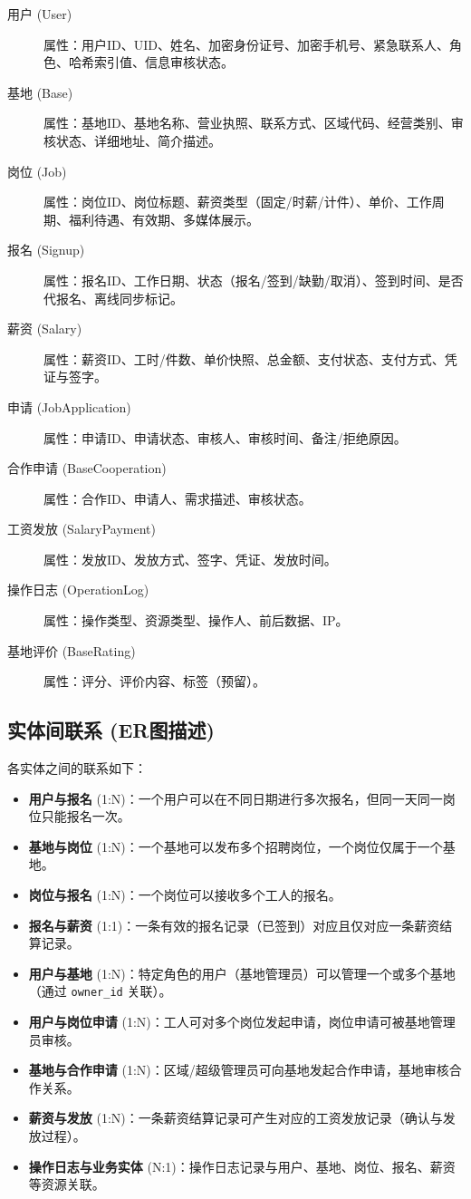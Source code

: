 \documentclass[UTF8,a4paper,12pt]{article}
\begin{document}
\begin{description}
    \item[用户 (User)] 属性：用户ID、UID、姓名、加密身份证号、加密手机号、紧急联系人、角色、哈希索引值、信息审核状态。
    \item[基地 (Base)] 属性：基地ID、基地名称、营业执照、联系方式、区域代码、经营类别、审核状态、详细地址、简介描述。
    \item[岗位 (Job)] 属性：岗位ID、岗位标题、薪资类型（固定/时薪/计件）、单价、工作周期、福利待遇、有效期、多媒体展示。
    \item[报名 (Signup)] 属性：报名ID、工作日期、状态（报名/签到/缺勤/取消）、签到时间、是否代报名、离线同步标记。
    \item[薪资 (Salary)] 属性：薪资ID、工时/件数、单价快照、总金额、支付状态、支付方式、凭证与签字。
    \item[申请 (JobApplication)] 属性：申请ID、申请状态、审核人、审核时间、备注/拒绝原因。
    \item[合作申请 (BaseCooperation)] 属性：合作ID、申请人、需求描述、审核状态。
    \item[工资发放 (SalaryPayment)] 属性：发放ID、发放方式、签字、凭证、发放时间。
    \item[操作日志 (OperationLog)] 属性：操作类型、资源类型、操作人、前后数据、IP。
    \item[基地评价 (BaseRating)] 属性：评分、评价内容、标签（预留）。
\end{description}

\subsection{实体间联系 (ER图描述)}
各实体之间的联系如下：

\begin{itemize}
    \item \textbf{用户与报名} (1:N)：一个用户可以在不同日期进行多次报名，但同一天同一岗位只能报名一次。
    \item \textbf{基地与岗位} (1:N)：一个基地可以发布多个招聘岗位，一个岗位仅属于一个基地。
    \item \textbf{岗位与报名} (1:N)：一个岗位可以接收多个工人的报名。
    \item \textbf{报名与薪资} (1:1)：一条有效的报名记录（已签到）对应且仅对应一条薪资结算记录。
    \item \textbf{用户与基地} (1:N)：特定角色的用户（基地管理员）可以管理一个或多个基地（通过 \texttt{owner\_id} 关联）。
    \item \textbf{用户与岗位申请} (1:N)：工人可对多个岗位发起申请，岗位申请可被基地管理员审核。
    \item \textbf{基地与合作申请} (1:N)：区域/超级管理员可向基地发起合作申请，基地审核合作关系。
    \item \textbf{薪资与发放} (1:N)：一条薪资结算记录可产生对应的工资发放记录（确认与发放过程）。
    \item \textbf{操作日志与业务实体} (N:1)：操作日志记录与用户、基地、岗位、报名、薪资等资源关联。
\end{itemize}
\end{document}
